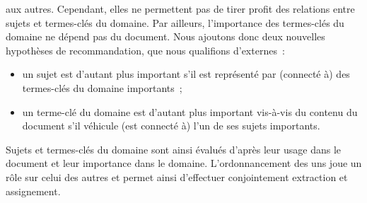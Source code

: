        aux autres. Cependant, elles ne permettent pas de tirer profit des
        relations entre sujets et termes-clés du domaine. Par ailleurs,
        l'importance des termes-clés du domaine ne  dépend pas du document. Nous
        ajoutons donc deux nouvelles hypothèses de recommandation, que nous
        qualifions d'externes~:
        \begin{itemize}
          \item{un sujet est d'autant plus important s'il est représenté par
                (connecté à) des termes-clés du domaine importants~;}
          \item{un terme-clé du domaine est d'autant plus important vis-à-vis
                du contenu du document s'il véhicule (est connecté à) l'un de
                ses sujets importants.}
        \end{itemize}
        Sujets et termes-clés du domaine sont ainsi évalués d'après leur usage
        dans le document et leur importance dans le domaine. L'ordonnancement
        des uns joue un rôle sur celui des autres et permet ainsi d'effectuer
        conjointement extraction et assignement.

